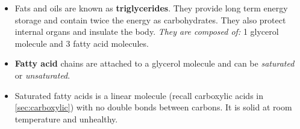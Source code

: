 \documentclass[letterpaper]{article}
\numberwithin{equation}{section}
\theoremstyle{classic}
\begin{document}
\begin{itemize}
\begin{lab}
        As a result, this can be used to determine the ripeness of bananas and other fruits as in the presence of air, starch breaks down into glucose which is a reducing sugar that can be tested. \\

        The \textbf{iodine test} is used to test for the presence of starch. Starch turns into an intense "blue-black" colour upon addition of iodine. In the absence of starch, the brown colour of the aqueous solution remains.
    \end{lab}
    \subsection{Lipids}
    \begin{idea}
        Lipids are hydrophobic macromolecules that are separated into four groups:
        \begin{multicols}{2}
            \begin{itemize}
                \item Fats and Oils
                \item Phospholipids
                \item Waxes
                \item Steroids
            \end{itemize}
        \end{multicols}
        They have many functions, which include:
        \begin{itemize}
            \item Fats act as a concentrated energy source.
            \item Phospholipids and cholesterol act as structural components of cell membranes.
            \item Steroid hormones are useful for communication.
            \item Waxes create protection from water.
        \end{itemize}
    \end{idea}
    \item Fats and oils are known as \textbf{triglycerides}. They provide long term energy storage and contain twice the energy as carbohydrates. They also protect internal organs and insulate the body. \textit{They are composed of:} 1 glycerol molecule and 3 fatty acid molecules.
    \item \textbf{Fatty acid} chains are attached to a glycerol molecule and can be \textit{saturated} or \textit{unsaturated}.
    \item Saturated fatty acids is a linear molecule (recall carboxylic acids in \ref{sec:carboxylic}) with no double bonds between carbons. It is solid at room temperature and unhealthy.

\end{itemize}
\end{document}

